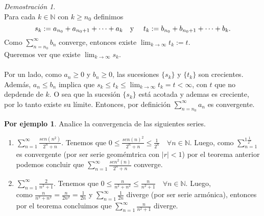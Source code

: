 \documentclass{article}
\theoremstyle{definition}
\theoremstyle{definition}
\newtheorem*{ej}{Por ejemplo}
\theoremstyle{remark}
\newtheorem*{demo}{Demostración}
\begin{document}
\begin{demo} \; \\
  Para cada $k \in \mathbb{N}$ con $k \geq n_0$ definimos $$s_k := a_{n_0}+a_{n_{0}+1}+\dots+a_k \text{\quad y \quad} t_k := b_{n_0}+b_{n_0+1}+\dots+b_k.$$
  Como $\sum_{n=n_0}^{\infty}{b_n}$ converge, entonces existe $\lim_{k \to \infty}{t_k}:=t$.
  \\ 
  Queremos ver que existe $\lim_{k\to\infty}{s_k}.$
\\\\
Por un lado, como $a_n \geq 0$ y $b_n \geq 0$, las sucesiones $\{s_k\}$ y $\{t_k\}$ son crecientes. \\
Además, $a_n \leq b_n$ implica que $s_k \leq t_k \leq \lim_{k \to \infty}{t_k}=t<\infty$, con $t$ que no depdende de $k$. O sea que la sucesión $\{s_k\}$ está acotada y ademas es creciente, por lo tanto existe su límite. Entonces, por definición $\sum_{n=n_0}^{\infty}{a_n}$ es convergente. 

\end{demo}
\pagebreak
\begin{ej}
  Analice la convergencia de las siguientes series.
  \begin{enumerate}
    \item $\sum_{n=1}^{\infty}{\frac{sen(n^2)}{2^n+n}}$. Tenemos que $0 \leq \frac{sen(n)^2}{2^n+n} \leq \frac{1}{2^n}\quad \forall n \in \mathbb{N}.$ Luego, como $\sum_{n=1}^{1\frac{1}{2^n}}$ es convergente (por ser serie geomémtrica con $|r|<1$) por el teorema anterior podemos concluir que $\sum_{n=1}^{\infty}{\frac{sen^2(n)}{2^n+n}}$ converge. \\
    \item $\sum_{n=1}^{\infty}{\frac{2}{n^2+1}}.$ Tenemos que $0 \leq \frac{n}{n^2+n^2}\leq \frac{n}{n^2+1} \quad \forall n \in \mathbb{N}$. Luego, \\
      como $\frac{n}{n^2+n^2}=\frac{n}{2n^2}=\frac{1}{2n}$ y $\sum_{n=1}^{\infty}{\frac{1}{2n}}$ diverge (por ser serie armónica), entonces por el teorema concluimos que $\sum_{n=1}^{\infty}{\frac{n}{n^2+1}}$ diverge.
      
  \end{enumerate}
\end{ej}
\end{document}
